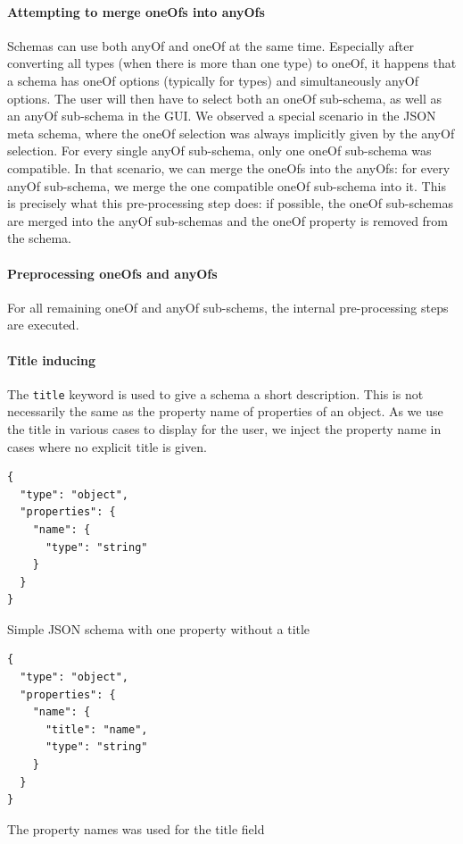 \paragraph{Attempting to merge oneOfs into anyOfs}
Schemas can use both anyOf and oneOf at the same time.
Especially after converting all types (when there is more than one type) to oneOf, it happens that a schema has oneOf options (typically for types) and simultaneously anyOf options.
The user will then have to select both an oneOf sub-schema, as well as an anyOf sub-schema in the GUI.
We observed a special scenario in the JSON meta schema, where the oneOf selection was always implicitly given by the anyOf selection.
For every single anyOf sub-schema, only one oneOf sub-schema was compatible.
In that scenario, we can merge the oneOfs into the anyOfs: for every anyOf sub-schema, we merge the one compatible oneOf sub-schema into it.
This is precisely what this pre-processing step does: if possible, the oneOf sub-schemas are merged into the anyOf sub-schemas and the oneOf property is removed from the schema.


\paragraph{Preprocessing oneOfs and anyOfs}
For all remaining oneOf and anyOf sub-schems, the internal pre-processing steps are executed.


\paragraph{Title inducing}

The \texttt{title} keyword is used to give a schema a short description.
This is not necessarily the same as the property name of properties of an object.
As we use the title in various cases to display for the user, we inject the property name in cases where no explicit title is given.

\begin{listing}[!h]
    \begin{verbatim}
{
  "type": "object",
  "properties": {
    "name": {
      "type": "string"
    }
  }
}
    \end{verbatim}
    \caption{Simple JSON schema with one property without a title}
    \label{listing:no-title}
\end{listing}

\begin{listing}[!h]
    \begin{verbatim}
{
  "type": "object",
  "properties": {
    "name": {
      "title": "name",
      "type": "string"
    }
  }
}
    \end{verbatim}
    \caption{The property names was used for the title field}
    \label{listing:with-title}
\end{listing}

